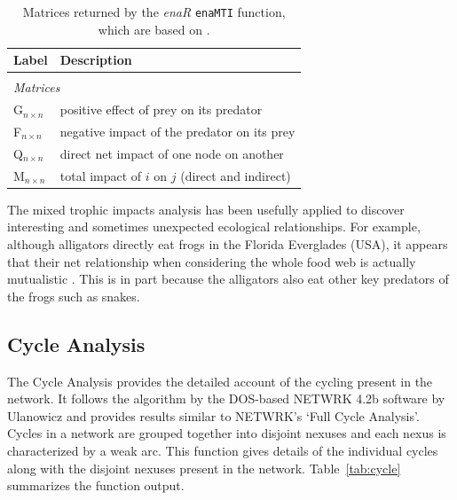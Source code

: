 \documentclass[article]{jss}
\begin{document}
\begin{table}[t]
  \caption{Matrices returned by the \textit{enaR}    %
    \texttt{enaMTI} function, which are based on \citep{ulanowicz90}.}\label{tab:mti}
  \center
  \begin{small}
    \begin{tabularx}{\textwidth}{l l}
      \textbf{Label} & \textbf{Description} \\ \hline \\[-1.5ex]
      \multicolumn{2}{l}{\textit{Matrices}} \\[1ex]
      G$_{n \times n}$ & positive effect of prey on its predator \\  %
      F$_{n \times n}$ & negative impact of the predator on its prey \\
      Q$_{n \times n}$ & direct net impact of one node on another\\
      M$_{n \times n}$ & total impact of $i$ on $j$ (direct and indirect) \\ \hline
\end{tabularx}
\end{small}
\end{table}

The mixed trophic impacts analysis has been usefully applied to
discover interesting and sometimes unexpected ecological
relationships.  For example, although alligators directly eat frogs in
the Florida Everglades (USA), it appears that their net relationship
when considering the whole food web is actually mutualistic
\citep{bondavalli99}.  This is in part because the alligators also eat
other key predators of the frogs such as snakes.


\subsection{Cycle Analysis}
The Cycle Analysis provides the detailed account of the cycling
present in the network. It follows the algorithm by the DOS-based
NETWRK 4.2b software by Ulanowicz \citep{ulanowicz91, ulanowicz83} and
provides results similar to NETWRK's `Full Cycle Analysis'.  Cycles in
a network are grouped together into disjoint nexuses and each nexus is
characterized by a weak arc. This function gives details of the
individual cycles along with the disjoint nexuses present in the
network.  Table~\ref{tab:cycle} summarizes the function output.

\end{document}
